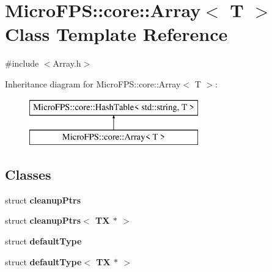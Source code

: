 \hypertarget{class_micro_f_p_s_1_1core_1_1_array}{
\section{MicroFPS::core::Array$<$ T $>$ Class Template Reference}
\label{d1/dcf/class_micro_f_p_s_1_1core_1_1_array}
}


{\ttfamily \#include $<$Array.h$>$}

Inheritance diagram for MicroFPS::core::Array$<$ T $>$:\begin{figure}[H]
\begin{center}
\leavevmode
\includegraphics[height=2.000000cm]{d1/dcf/class_micro_f_p_s_1_1core_1_1_array}
\end{center}
\end{figure}
\subsection*{Classes}
\begin{DoxyCompactItemize}
\item 
struct {\bfseries cleanupPtrs}
\item 
struct {\bfseries cleanupPtrs$<$ TX $\ast$ $>$}
\item 
struct {\bfseries defaultType}
\item 
struct {\bfseries defaultType$<$ TX $\ast$ $>$}
\end{DoxyCompactItemize}
